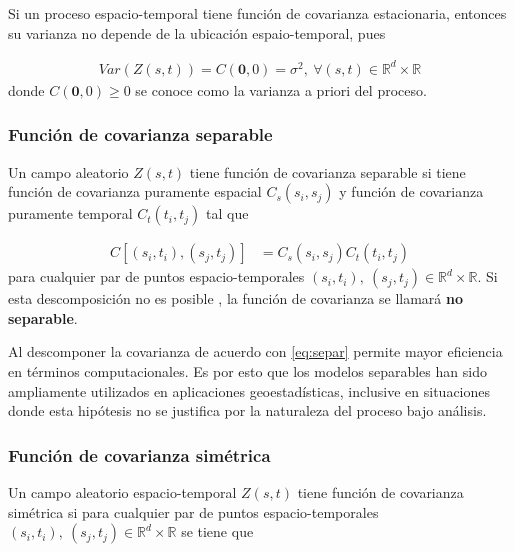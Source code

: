 \documentclass[
]{book}
\begin{document}
Si un proceso espacio-temporal tiene función de covarianza estacionaria, entonces su varianza no depende de la ubicación espaio-temporal, pues

\[
\begin{align*}
Var(Z(s,t))=C(\boldsymbol 0,0)=\sigma^2,\ \forall (s,t) \in \mathbb{R}^d \times \mathbb{R}
\end{align*}
\] donde \(C(\boldsymbol 0,0) \geq 0\) se conoce como la varianza a priori del proceso.

\hypertarget{funciuxf3n-de-covarianza-separable}{%
\subsubsection*{Función de covarianza separable}\label{funciuxf3n-de-covarianza-separable}}

Un campo aleatorio \(Z(s,t)\) tiene función de covarianza separable si tiene función de covarianza puramente espacial \(C_s(s_i,s_j)\) y función de covarianza puramente temporal \(C_t(t_i,t_j)\) tal que

\[
\begin{align}
C[(s_i,t_i),(s_j,t_j)]&=C_s(s_i,s_j)C_t(t_i,t_j) 
\label{eq:separ}
\end{align}
\] para cualquier par de puntos espacio-temporales \((s_i,t_i),\ (s_j,t_j)\in \mathbb{R}^d\times \mathbb{R}\). Si esta descomposición no es posible , la función de covarianza se llamará \textbf{no separable}.

Al descomponer la covarianza de acuerdo con \eqref{eq:separ} permite mayor eficiencia en términos computacionales. Es por esto que los modelos separables han sido ampliamente utilizados en aplicaciones geoestadísticas, inclusive en situaciones donde esta hipótesis no se justifica por la naturaleza del proceso bajo análisis.

\hypertarget{funciuxf3n-de-covarianza-simuxe9trica}{%
\subsubsection*{Función de covarianza simétrica}\label{funciuxf3n-de-covarianza-simuxe9trica}}

Un campo aleatorio espacio-temporal \(Z(s,t)\) tiene función de covarianza simétrica si para cualquier par de puntos espacio-temporales \((s_i,t_i),\ (s_j,t_j)\in \mathbb{R}^d \times \mathbb{R}\) se tiene que
\end{document}
